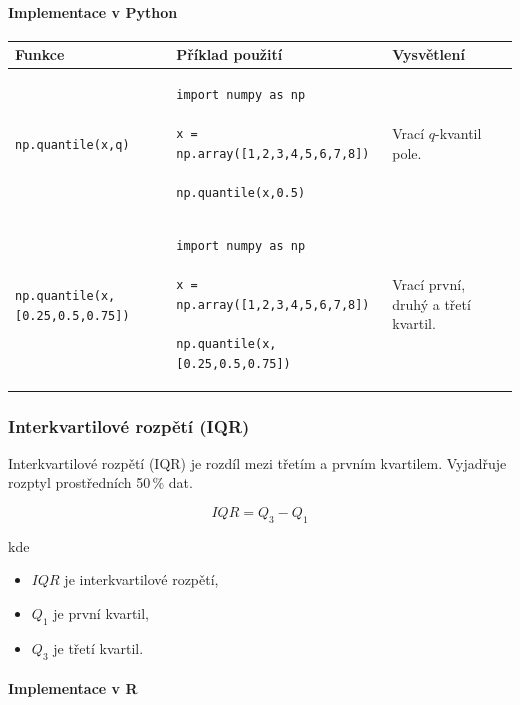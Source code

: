 \documentclass[a4paper, 11pt]{article}
\newenvironment{funkcedict}
{%
  \begingroup
  \renewcommand{\arraystretch}{1.4}%
  \lstset{basicstyle=\ttfamily\small, columns=fullflexible}%
  \setlength{\tabcolsep}{4pt}%
  \begin{tabular}{p{0.19\textwidth} p{0.38\textwidth} p{0.30\textwidth}}
  \textbf{Funkce} & \textbf{Příklad použití} & \textbf{Vysvětlení} \\
  \midrule
}
{%
  \end{tabular}%
  \endgroup
}
\begin{document}
\paragraph{Implementace v Python}\mbox{}\par

\begin{funkcedict}

	\texttt{np.quantile(x,q)} &
	\begin{lstlisting}
import numpy as np

x = np.array([1,2,3,4,5,6,7,8])

np.quantile(x,0.5)
	\end{lstlisting}
	&
	Vrací $q$-kvantil pole.
	\\

	\texttt{np.quantile(x, [0.25,0.5,0.75])} &
	\begin{lstlisting}
import numpy as np

x = np.array([1,2,3,4,5,6,7,8])

np.quantile(x,[0.25,0.5,0.75])
	\end{lstlisting}
	&
	Vrací první, druhý a třetí kvartil.
	\\

\end{funkcedict}

\subsubsection{Interkvartilové rozpětí (IQR)}

Interkvartilové rozpětí (IQR) je rozdíl mezi třetím
a prvním kvartilem. Vyjadřuje rozptyl prostředních
50\,\% dat.

\begin{equation*}
	IQR = Q_3 - Q_1
\end{equation*}

kde

\begin{itemize}[noitemsep]
	\item $IQR$ je interkvartilové rozpětí,
	\item $Q_1$ je první kvartil,
	\item $Q_3$ je třetí kvartil.
\end{itemize}

\paragraph{Implementace v R}\mbox{}\par
\end{document}
